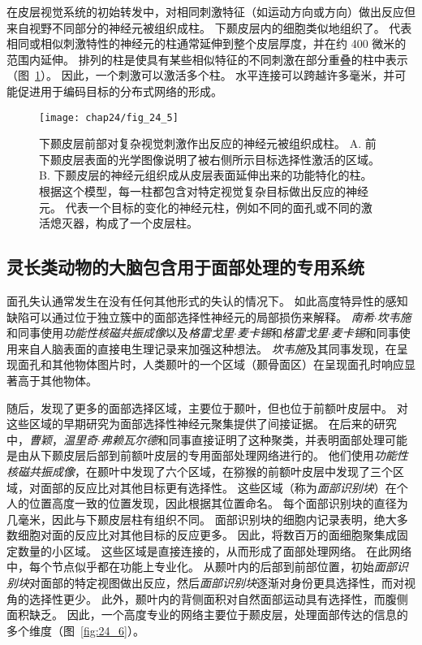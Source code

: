 在皮层视觉系统的初始转发中，对相同刺激特征（如运动方向或方向）做出反应但来自视野不同部分的神经元被组织成柱。
下颞皮层内的细胞类似地组织了。
代表相同或相似刺激特性的神经元的柱通常延伸到整个皮层厚度，并在约 400 微米的范围内延伸。
排列的柱是使具有某些相似特征的不同刺激在部分重叠的柱中表示（图~\ref{fig:24_5}）。
因此，一个刺激可以激活多个柱。
水平连接可以跨越许多毫米，并可能促进用于编码目标的分布式网络的形成。


\begin{figure}[htbp]
	\centering
	\texttt{[image: chap24/fig\_24\_5]}
	\caption{下颞皮层前部对复杂视觉刺激作出反应的神经元被组织成柱。
		A. 前下颞皮层表面的光学图像说明了被右侧所示目标选择性激活的区域。
		B. 下颞皮层的神经元组织成从皮层表面延伸出来的功能特化的柱。
		根据这个模型，每一柱都包含对特定视觉复杂目标做出反应的神经元。
		代表一个目标的变化的神经元柱，例如不同的面孔或不同的激活熄灭器，构成了一个皮层柱。}
	\label{fig:24_5}
\end{figure}



\subsection{灵长类动物的大脑包含用于面部处理的专用系统}

面孔失认通常发生在没有任何其他形式的失认的情况下。
如此高度特异性的感知缺陷可以通过位于独立簇中的面部选择性神经元的局部损伤来解释。
\textit{南希$\cdot$坎韦施}和同事使用\textit{功能性核磁共振成像}以及\textit{格雷戈里$\cdot$麦卡锡}和\textit{格雷戈里$\cdot$麦卡锡}和同事使用来自人脑表面的直接电生理记录来加强这种想法。
\textit{坎韦施}及其同事发现，在呈现面孔和其他物体图片时，人类颞叶的一个区域（颞骨面区）在呈现面孔时响应显著高于其他物体。


随后，发现了更多的面部选择区域，主要位于颞叶，但也位于前额叶皮层中。
对这些区域的早期研究为面部选择性神经元聚集提供了间接证据。
在后来的研究中，\textit{曹颖}，\textit{温里奇$\cdot$弗赖瓦尔德}和同事直接证明了这种聚类，并表明面部处理可能是由从下颞皮层后部到前额叶皮层的专用面部处理网络进行的。
他们使用\textit{功能性核磁共振成像}，在颞叶中发现了六个区域，在猕猴的前额叶皮层中发现了三个区域，对面部的反应比对其他目标更有选择性。
这些区域（称为\textit{面部识别块}）在个人的位置高度一致的位置发现，因此根据其位置命名。
每个面部识别块的直径为几毫米，因此与下颞皮层柱有组织不同。
面部识别块的细胞内记录表明，绝大多数细胞对面的反应比对其他目标的反应更多。
因此，将数百万的面细胞聚集成固定数量的小区域。
这些区域是直接连接的，从而形成了面部处理网络。
在此网络中，每个节点似乎都在功能上专业化。
从颞叶内的后部到前部位置，初始\textit{面部识别块}对面部的特定视图做出反应，然后\textit{面部识别块}逐渐对身份更具选择性，而对视角的选择性更少。 
此外，颞叶内的背侧面积对自然面部运动具有选择性，而腹侧面积缺乏。
因此，一个高度专业的网络主要位于颞皮层，处理面部传达的信息的多个维度（图~\ref{fig:24_6}）。


